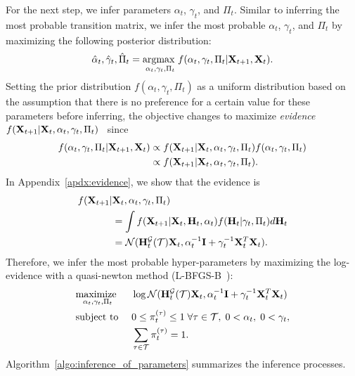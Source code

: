 \documentclass[journal]{IEEEtran}
\begin{document}
For the next step, we infer parameters $\alpha_t$, $\gamma_t$, and $\Pi_t$.
Similar to inferring the most probable transition matrix, we infer the most probable $\alpha_t$, $\gamma_t$, and $\Pi_t$ by maximizing the following posterior distribution:
\begin{equation}
    \hat\alpha_t,\hat\gamma_t,\hat{\Pi}_t=\underset{\alpha_t,\gamma_t,{\Pi}_t}{\text{argmax }}f(\alpha_t,\gamma_t,{\Pi}_t|{\bf{X}}_{t+1},{\bf{X}}_t).
\end{equation}
Setting the prior distribution $f(\alpha_t,\gamma_t,{\Pi}_t)$ as a uniform distribution based on the assumption that there is no preference for a certain value for these parameters before inferring, the objective changes to maximize {\it{evidence}} $f({\bf{X}}_{t+1}|{\bf{X}}_t,\alpha_t,\gamma_t,{\Pi}_t)$~\cite{mackay1992bayesian} since
\begin{equation}
\begin{aligned}
f(\alpha_t,\gamma_t,{\Pi}_t|{\bf{X}}_{t+1},{\bf{X}}_t)&\propto f({\bf{X}}_{t+1}|{\bf{X}}_t,\alpha_t,\gamma_t,{\Pi}_t)f(\alpha_t,\gamma_t,{\Pi}_t)
\\&\propto f({\bf{X}}_{t+1}|{\bf{X}}_t,\alpha_t,\gamma_t,{\Pi}_t).\end{aligned}
\end{equation}
In Appendix~\ref{apdx:evidence}, we show that the evidence is
\begin{equation}\label{eqn:weighted_average}
\begin{aligned}
    f({\bf{X}}_{t+1}|&{\bf{X}}_t,\alpha_t,\gamma_t,{\Pi}_t)\\
    &=\int f({\bf{X}}_{t+1}|{\bf{X}}_t,{\bf{H}}_t,\alpha_t) f({\bf{H}}_t|\gamma_t,{\Pi}_t)d{\bf{H}}_t\\
    &=\mathcal{N}({\bf{H}}_t^{\mathcal{G}}(\mathcal{T}){\bf{X}}_t,\alpha_t^{-1}{\bf{I}}+\gamma_t^{-1}{\bf{X}}_t^T{\bf{X}}_t).
\end{aligned}
\end{equation}
Therefore, we infer the most probable hyper-parameters by maximizing the log-evidence with a quasi-newton method (L-BFGS-B~\cite{byrd1995limited}):
\begin{equation}\label{eqn:evidence_maximization}
\begin{aligned}
    &\underset{\alpha_t,\gamma_t,{\Pi}_t}{\text{maximize }}& &\log\mathcal{N}({\bf{H}}_t^{\mathcal{G}}(\mathcal{T}){\bf{X}}_t,\alpha_t^{-1}{\bf{I}}+\gamma_t^{-1}{\bf{X}}_t^T{\bf{X}}_t)
    \\&\text{subject to }& & 0\le\pi_t^{(\tau)}\le 1\;\forall \tau\in\mathcal{T},\;0<\alpha_t,\;0<\gamma_t,
    \\& & &\sum_{\tau\in\mathcal{T}}\pi_t^{(\tau)}=1.
\end{aligned}
\end{equation}
Algorithm~\ref{algo:inference_of_parameters} summarizes the inference processes.
\end{document}
